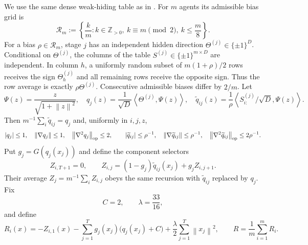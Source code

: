 \documentclass[11pt,a4paper]{article}
\newcommand{\norm}[1]{\left\lVert #1\right\rVert}
\newcommand{\inner}[2]{\left\langle #1,#2\right\rangle}
\theoremstyle{remark}
\begin{document}
We use the same dense weak-hiding table as in \cite{dense2026}.  For $m$
agents its admissible bias grid is
\begin{equation}
 \mathcal R_m:=\left\{
 \frac{k}{m}: k\in\mathbb Z_{>0},\ k\equiv m\pmod 2,\
 k\le\frac m8
 \right\}.
 \label{eq:retiring-bias-grid}
\end{equation}
For a bias $\rho\in\mathcal R_m$, stage $j$ has an independent hidden
direction $\Theta^{(j)}\in\{\pm1\}^D$.  Conditional on
$\Theta^{(j)}$, the columns of the table
$S^{(j)}\in\{\pm1\}^{m\times D}$ are independent.  In column $h$, a
uniformly random subset of $m(1+\rho)/2$ rows receives the sign
$\Theta_h^{(j)}$ and all remaining rows receive the opposite sign.  Thus the
row average is exactly $\rho\Theta^{(j)}$.  Consecutive admissible biases
differ by $2/m$.  Let
\begin{equation}
 \Psi(z)=\frac{z}{\sqrt{1+\norm z^2}},
 \quad
 q_j(z)=\frac1{\sqrt D}\inner{\Theta^{(j)}}{\Psi(z)},
 \quad
 \widetilde q_{ij}(z)=
 \frac1\rho\inner{S^{(j)}_{i:}/\sqrt D}{\Psi(z)}.
 \label{eq:retiring-radial-coordinates}
\end{equation}
Then $m^{-1}\sum_i\widetilde q_{ij}=q_j$ and, uniformly in $i,j,z$,
\begin{equation}
 |q_j|\le1,
 \quad \norm{\nabla q_j}\le1,
 \quad \norm{\nabla^2q_j}_{\rm op}\le2,
 \qquad
 |\widetilde q_{ij}|\le\rho^{-1},
 \quad \norm{\nabla\widetilde q_{ij}}\le\rho^{-1},
 \quad \norm{\nabla^2\widetilde q_{ij}}_{\rm op}\le2\rho^{-1}.
 \label{eq:retiring-radial-bounds}
\end{equation}
Put $g_j=G(q_j(x_j))$ and define the component selectors
\begin{equation}
 Z_{i,T+1}=0,
 \qquad
 Z_{i,j}=(1-g_j)\widetilde q_{ij}(x_j)+g_jZ_{i,j+1}.
 \label{eq:component-retiring-selector}
\end{equation}
Their average $Z_j=m^{-1}\sum_iZ_{i,j}$ obeys the same recursion with
$\widetilde q_{ij}$ replaced by $q_j$.  Fix
\[
 C=2,
 \qquad
 \lambda=\frac{33}{16},
\]
and define
\begin{equation}
 R_i(x)=
 -Z_{i,1}(x)
 -\sum_{j=1}^Tg_j(x_j)\bigl(q_j(x_j)+C\bigr)
 +\frac\lambda2\sum_{j=1}^T\norm{x_j}^2,
 \qquad
 R=\frac1m\sum_{i=1}^mR_i.
 \label{eq:retiring-chain}
\end{equation}
\end{document}
